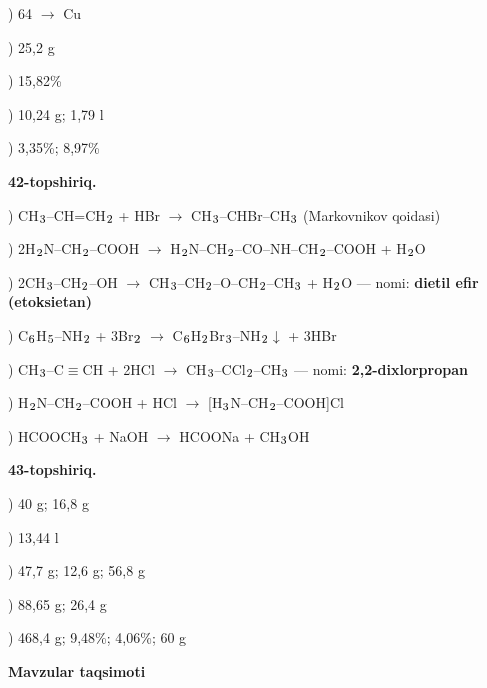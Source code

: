 \documentclass[11pt,a4paper]{article}
\renewcommand{\textsubscript}[1]{\ensuremath{_{\text{\fontsize{8}{8}\selectfont #1}}}}
\begin{document}
) 64 $\to$ Cu\par
{}) 25,2 g\par
{}) 15,82\%\par
{}) 10,24 g; 1,79 l\par
{}) 3,35\%; 8,97\%\par
\noindent\textbf{42-topshiriq.}\par
{}) CH\textsubscript{3}--CH=CH\textsubscript{2} + HBr $\to$ CH\textsubscript{3}--CHBr--CH\textsubscript{3} (Markovnikov qoidasi)\par
{}) 2H\textsubscript{2}N--CH\textsubscript{2}--COOH $\to$ H\textsubscript{2}N--CH\textsubscript{2}--CO--NH--CH\textsubscript{2}--COOH + H\textsubscript{2}O\par
{}) 2CH\textsubscript{3}--CH\textsubscript{2}--OH $\to$ CH\textsubscript{3}--CH\textsubscript{2}--O--CH\textsubscript{2}--CH\textsubscript{3} + H\textsubscript{2}O --- nomi: \textbf{dietil efir (etoksietan)}\par
{}) C\textsubscript{6}H\textsubscript{5}--NH\textsubscript{2} + 3Br\textsubscript{2} $\to$ C\textsubscript{6}H\textsubscript{2}Br\textsubscript{3}--NH\textsubscript{2}$\downarrow$ + 3HBr\par
{}) CH\textsubscript{3}--C$\equiv$CH + 2HCl $\to$ CH\textsubscript{3}--CCl\textsubscript{2}--CH\textsubscript{3} --- nomi: \textbf{2,2-dixlorpropan}\par
{}) H\textsubscript{2}N--CH\textsubscript{2}--COOH + HCl $\to$ [H\textsubscript{3}N--CH\textsubscript{2}--COOH]Cl\par
{}) HCOOCH\textsubscript{3} + NaOH $\to$ HCOONa + CH\textsubscript{3}OH\par
\noindent\textbf{43-topshiriq.}\par
{}) 40 g; 16,8 g\par
{}) 13,44 l\par
{}) 47,7 g; 12,6 g; 56,8 g\par
{}) 88,65 g; 26,4 g\par
{}) 468,4 g; 9,48\%; 4,06\%; 60 g\par
\par\bigskip\noindent\textbf{Mavzular taqsimoti}\par\smallskip
\end{document}
